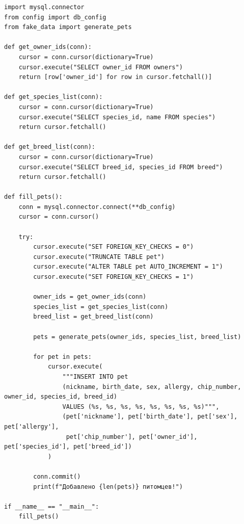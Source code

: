 \documentclass[a4paper]{article}
\begin{document}
\begin{lstlisting}[caption = Заполнение таблицы Pet, basicstyle= \scriptsize \ttfamily]
import mysql.connector
from config import db_config
from fake_data import generate_pets

def get_owner_ids(conn):
    cursor = conn.cursor(dictionary=True)
    cursor.execute("SELECT owner_id FROM owners")
    return [row['owner_id'] for row in cursor.fetchall()]

def get_species_list(conn):
    cursor = conn.cursor(dictionary=True)
    cursor.execute("SELECT species_id, name FROM species")
    return cursor.fetchall()

def get_breed_list(conn):
    cursor = conn.cursor(dictionary=True)
    cursor.execute("SELECT breed_id, species_id FROM breed")
    return cursor.fetchall()

def fill_pets():
    conn = mysql.connector.connect(**db_config)
    cursor = conn.cursor()
    
    try:
        cursor.execute("SET FOREIGN_KEY_CHECKS = 0")
        cursor.execute("TRUNCATE TABLE pet")
        cursor.execute("ALTER TABLE pet AUTO_INCREMENT = 1")
        cursor.execute("SET FOREIGN_KEY_CHECKS = 1")

        owner_ids = get_owner_ids(conn)
        species_list = get_species_list(conn)
        breed_list = get_breed_list(conn)

        pets = generate_pets(owner_ids, species_list, breed_list)
        
        for pet in pets:
            cursor.execute(
                """INSERT INTO pet 
                (nickname, birth_date, sex, allergy, chip_number, owner_id, species_id, breed_id)
                VALUES (%s, %s, %s, %s, %s, %s, %s, %s)""",
                (pet['nickname'], pet['birth_date'], pet['sex'], pet['allergy'],
                 pet['chip_number'], pet['owner_id'], pet['species_id'], pet['breed_id'])
            )
        
        conn.commit()
        print(f"Добавлено {len(pets)} питомцев!")

if __name__ == "__main__":
    fill_pets()
\end{lstlisting}
\end{document}
